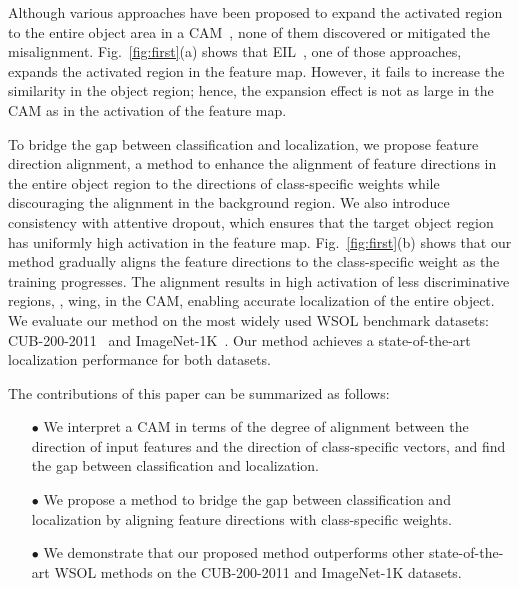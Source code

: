 Although various approaches have been proposed to expand the activated region to the entire object area in a CAM~\cite{zhang2018adversarial,choe2019attention,mai2020erasing,yun2019cutmix,xue2019danet,zhang2018self}, none of them discovered or mitigated the misalignment. Fig.~\ref{fig:first}(a) shows that EIL~\cite{mai2020erasing}, one of those approaches, expands the activated region in the feature map. However, it fails to increase the similarity in the object region; hence, the expansion effect is not as large in the CAM as in the activation of the feature map.

To bridge the gap between classification and localization, we propose feature direction alignment, a method to enhance the alignment of feature directions in the entire object region to the directions of class-specific weights while discouraging the alignment in the background region.
We also introduce consistency with attentive dropout, which ensures that the target object region has uniformly high activation in the feature map.
Fig.~\ref{fig:first}(b) shows that our method gradually aligns the feature directions to the class-specific weight as the training progresses.
The alignment results in high activation of less discriminative regions, \eg, wing, in the CAM, enabling accurate localization of the entire object.
We evaluate our method on the most widely used WSOL benchmark datasets: CUB-200-2011~\cite{welinder2010caltech} and ImageNet-1K~\cite{russakovsky2015imagenet}.
Our method achieves a state-of-the-art localization performance for both datasets.

The contributions of this paper can be summarized as follows:
\begin{itemize}
\setlength{\itemsep}{2pt}
\vspace{-3pt}
	\item[$\bullet$] We interpret a CAM in terms of the degree of alignment between the direction of input features and the direction of class-specific vectors, and find the gap between classification and localization.
	\vspace{-2pt}
	\item[$\bullet$] We propose a method to bridge the gap between classification and localization by aligning feature directions with class-specific weights.
	\vspace{-2pt}
	\item[$\bullet$] We demonstrate that our proposed method outperforms other state-of-the-art WSOL methods on the CUB-200-2011 and ImageNet-1K datasets.
\end{itemize}